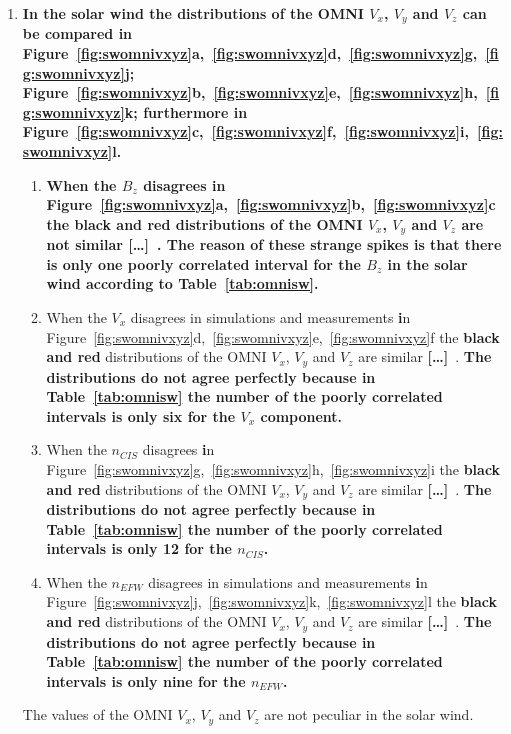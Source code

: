 \documentclass[linenumbers,draft]{agujournal}
\newcommand{\del}{\textbf{[\dots]}\ } %
\begin{document}
\begin{enumerate}
\item \textbf{In the solar wind the distributions of the OMNI $V_{x}$, $V_{y}$ and $V_{z}$ can be compared \textbf{i}n Figure~\ref{fig:swomnivxyz}a,~\ref{fig:swomnivxyz}d,~\ref{fig:swomnivxyz}g,~\ref{fig:swomnivxyz}j; Figure~\ref{fig:swomnivxyz}b,~\ref{fig:swomnivxyz}e,~\ref{fig:swomnivxyz}h,~\ref{fig:swomnivxyz}k; furthermore \textbf{i}n Figure~\ref{fig:swomnivxyz}c,~\ref{fig:swomnivxyz}f,~\ref{fig:swomnivxyz}i,~\ref{fig:swomnivxyz}l.}
\begin{enumerate} 
\item \textbf{When the $B_{z}$ disagrees \textbf{i}n Figure~\ref{fig:swomnivxyz}a,~\ref{fig:swomnivxyz}b,~\ref{fig:swomnivxyz}c the black and red distributions of the OMNI $V_{x}$, $V_{y}$ and $V_{z}$ are not similar \del . The reason of these strange spikes is that there is only one poorly correlated interval for the $B_{z}$ in the solar wind according to Table~\ref{tab:omnisw}.}

\item When the $V_{x}$ disagrees in simulations and measurements \textbf{i}n Figure~\ref{fig:swomnivxyz}d,~\ref{fig:swomnivxyz}e,~\ref{fig:swomnivxyz}f the \textbf{black and red} distributions of the OMNI $V_{x}$, $V_{y}$ and $V_{z}$ are similar \del . \textbf{The distributions do not agree perfectly because in Table~\ref{tab:omnisw} the number of the poorly correlated intervals is only six for the $V_{x}$ component.}
 
\item When the $n_{CIS}$ disagrees \textbf{i}n Figure~\ref{fig:swomnivxyz}g,~\ref{fig:swomnivxyz}h,~\ref{fig:swomnivxyz}i the \textbf{black and red} distributions of the OMNI $V_{x}$, $V_{y}$ and $V_{z}$ are similar \del . \textbf{The distributions do not agree perfectly because in Table~\ref{tab:omnisw} the number of the poorly correlated intervals is only 12 for the $n_{CIS}$.}

\item When the $n_{EFW}$ disagrees in simulations and measurements \textbf{i}n Figure~\ref{fig:swomnivxyz}j,~\ref{fig:swomnivxyz}k,~\ref{fig:swomnivxyz}l the \textbf{black and red} distributions of the OMNI $V_{x}$, $V_{y}$ and $V_{z}$ are similar \del . \textbf{The distributions do not agree perfectly because in Table~\ref{tab:omnisw} the number of the poorly correlated intervals is only nine for the $n_{EFW}$.}
\end{enumerate}
The values of the OMNI $V_{x}$, $V_{y}$ and $V_{z}$ are not peculiar in the solar wind. 
  

\end{enumerate}
\end{document}
